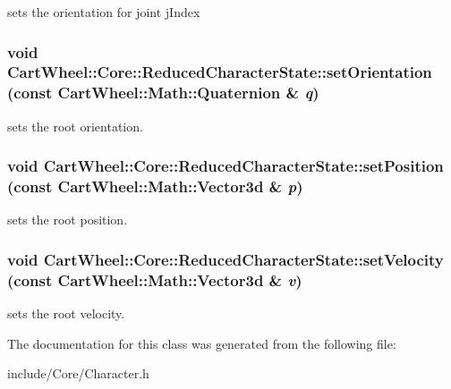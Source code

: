 \label{classCartWheel_1_1Core_1_1ReducedCharacterState_a84a0a6a1f1525c630cf4bb8549a0eca5}
sets the orientation for joint jIndex \hypertarget{classCartWheel_1_1Core_1_1ReducedCharacterState_a9af2d2e546fdc867ccc45b069e3f9722}{
\subsubsection[{setOrientation}]{\setlength{\rightskip}{0pt plus 5cm}void CartWheel::Core::ReducedCharacterState::setOrientation (const {\bf CartWheel::Math::Quaternion} \& {\em q})}}
\label{classCartWheel_1_1Core_1_1ReducedCharacterState_a9af2d2e546fdc867ccc45b069e3f9722}
sets the root orientation. \hypertarget{classCartWheel_1_1Core_1_1ReducedCharacterState_a613c33842feef1068f73dc49c6d61ac2}{
\subsubsection[{setPosition}]{\setlength{\rightskip}{0pt plus 5cm}void CartWheel::Core::ReducedCharacterState::setPosition (const {\bf CartWheel::Math::Vector3d} \& {\em p})}}
\label{classCartWheel_1_1Core_1_1ReducedCharacterState_a613c33842feef1068f73dc49c6d61ac2}
sets the root position. \hypertarget{classCartWheel_1_1Core_1_1ReducedCharacterState_af2cccddb47d48597d4107d5ef84e3396}{
\subsubsection[{setVelocity}]{\setlength{\rightskip}{0pt plus 5cm}void CartWheel::Core::ReducedCharacterState::setVelocity (const {\bf CartWheel::Math::Vector3d} \& {\em v})}}
\label{classCartWheel_1_1Core_1_1ReducedCharacterState_af2cccddb47d48597d4107d5ef84e3396}
sets the root velocity. 

The documentation for this class was generated from the following file:\begin{DoxyCompactItemize}
\item 
include/Core/Character.h\end{DoxyCompactItemize}
